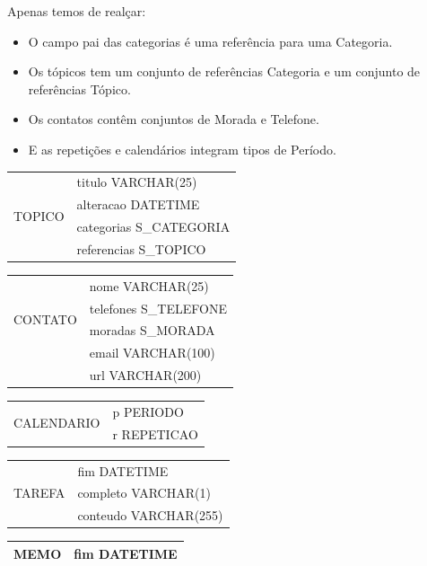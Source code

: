 \documentclass[a4paper,12pt]{article}
\begin{document}
	Apenas temos de realçar:

	\begin{itemize}
		\item O campo pai das categorias é uma referência para uma Categoria.
		\item Os tópicos tem um conjunto de referências Categoria e um conjunto de referências Tópico.
		\item Os contatos contêm conjuntos de Morada e Telefone.
		\item E as repetições e calendários integram tipos de Período. 
	\end{itemize}

	\begin{multicols}{2}

		\begin{tabular}{|c|l|} \hline
			\multirow{4}{*}{TOPICO}
			& titulo VARCHAR(25) \\
			& alteracao DATETIME \\ 
			& categorias S\_CATEGORIA \\
			& referencias S\_TOPICO\\ \hline 
		\end{tabular}
		
		\begin{tabular}{|c|l|} \hline
			\multirow{4}{*}{CONTATO}
			& nome VARCHAR(25) \\
			& telefones S\_TELEFONE \\ 
			& moradas S\_MORADA \\
			& email VARCHAR(100) \\ 
			& url VARCHAR(200) \\ \hline 
		\end{tabular}
		
		\begin{tabular}{|c|l|} \hline
			\multirow{2}{*}{CALENDARIO}
			& p PERIODO \\
			& r REPETICAO \\ \hline 
		\end{tabular}
		
		\begin{tabular}{|c|l|} \hline
			\multirow{3}{*}{TAREFA}
			& fim DATETIME \\
			& completo VARCHAR(1) \\ 
			& conteudo VARCHAR(255) \\ \hline 
		\end{tabular}
		
		\begin{tabular}{|c|l|} \hline
			MEMO & fim DATETIME \\ \hline
		\end{tabular}
		

\end{multicols}
\end{document}
